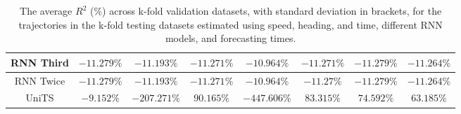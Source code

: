 \begin{table}[!ht]
{\begin{tabular}{|c|c|c|c|c|c|c|c|}
			RNN Third & $-11.279\%$ & $-11.193\%$ & $-11.271\%$ & $-10.964\%$ & $-11.271\%$ & $-11.279\%$ & $-11.264\%$ \\ \hline
			RNN Twice & $-11.279\%$ & $-11.193\%$ & $-11.271\%$ & $-10.964\%$ & $-11.27\%$ & $-11.279\%$ & $-11.264\%$ \\ \hline
			UniTS & $-9.152\%$ & $-207.271\%$ & $90.165\%$ & $-447.606\%$ & $83.315\%$ & $74.592\%$ & $63.185\%$ \\ \hline
		\end{tabular}
	}
	\caption{The average $R^{2}$ (\%) across k-fold validation datasets, with standard deviation in brackets, for the trajectories in the k-fold testing datasets estimated using speed, heading, and time, different RNN models, and forecasting times.}
	\label{tab:all_speed_actual_dir_R2}
\end{table}

